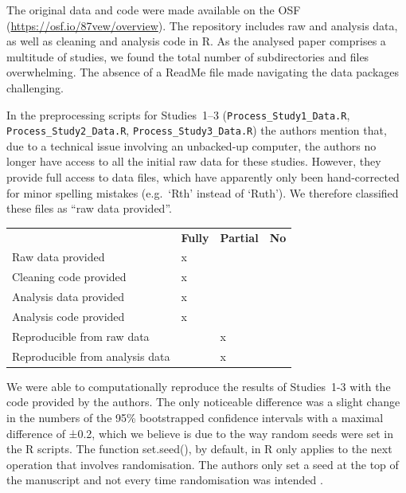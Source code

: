 \documentclass[
  letterpaper,
  DIV=11,
  numbers=noendperiod]{scrartcl}
\begin{document}
The original data and code were made available on the OSF
(\url{https://osf.io/87vew/overview}). The repository includes raw and
analysis data, as well as cleaning and analysis code in R. As the
analysed paper comprises a multitude of studies, we found the total
number of subdirectories and files overwhelming. The absence of a ReadMe
file made navigating the data packages challenging.~

In the preprocessing scripts for Studies~1--3
(\texttt{Process\_Study1\_Data.R}, \texttt{Process\_Study2\_Data.R},
\texttt{Process\_Study3\_Data.R}) the authors mention that, due to a
technical issue involving an unbacked-up computer, the authors no longer
have access to all the initial raw data for these studies. However, they
provide full access to data files, which have apparently only been
hand-corrected for minor spelling mistakes (e.g.~`Rth' instead of
`Ruth'). We therefore classified these files as ``raw data
provided''.~\\

\begin{longtable}[]{@{}llll@{}}
\toprule\noalign{}
\endhead
\bottomrule\noalign{}
\endlastfoot
& \textbf{Fully} & \textbf{Partial} & \textbf{No} \\
Raw data provided & x & & \\
Cleaning code provided & x & & \\
Analysis data provided & x & & \\
Analysis code provided & x & & \\
Reproducible from raw data & & x & \\
Reproducible from analysis data & & x & \\
\end{longtable}

We were able to computationally reproduce the results of Studies~1-3
with the code provided by the authors. The only noticeable difference
was a slight change in the numbers of the 95\% bootstrapped confidence
intervals with a maximal difference of ±0.2, which we believe is due to
the way random seeds were set in the R scripts. The function set.seed(),
by default, in R only applies to the next operation that involves
randomisation. The authors only set a seed at the top of the manuscript
and not every time randomisation was intended .
\end{document}
